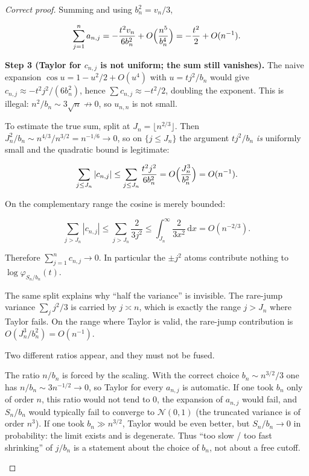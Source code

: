 \documentclass[11pt,a4paper]{article}
\begin{document}
\begin{proof}[Correct proof]
Summing and using \(b_{n}^{2}=v_{n}/3\),

\[
\sum_{j=1}^{n}a_{n,j}
=
-\frac{t^{2}v_{n}}{6b_{n}^{2}}
+
O\Bigl(\frac{n^{5}}{b_{n}^{4}}\Bigr)
=
-\frac{t^{2}}{2}
+
O(n^{-1}).
\]

\textbf{Step 3 (Taylor for \(c_{n,j}\) is not uniform; the sum still vanishes).}
The naive expansion \(\cos u=1-u^{2}/2+O(u^{4})\) with \(u=tj^{2}/b_{n}\) would give \(c_{n,j}\approx -t^{2}j^{2}/(6b_{n}^{2})\), hence \(\sum c_{n,j}\approx -t^{2}/2\), doubling the exponent. This is illegal: \(n^{2}/b_{n}\sim 3\sqrt{n}\not\to 0\), so \(u_{n,n}\) is not small.

To estimate the true sum, split at \(J_{n}=\lfloor n^{2/3}\rfloor\). Then \(J_{n}^{2}/b_{n}\sim n^{4/3}/n^{3/2}=n^{-1/6}\to 0\), so on \(\{j\le J_{n}\}\) the argument \(tj^{2}/b_{n}\) \emph{is} uniformly small and the quadratic bound is legitimate:

\[
\sum_{j\le J_{n}}|c_{n,j}|
\le
\sum_{j\le J_{n}}\frac{t^{2}j^{2}}{6b_{n}^{2}}
=
O\Bigl(\frac{J_{n}^{3}}{b_{n}^{2}}\Bigr)
=
O(n^{-1}).
\]

On the complementary range the cosine is merely bounded:

\[
\sum_{j>J_{n}}|c_{n,j}|
\le
\sum_{j>J_{n}}\frac{2}{3j^{2}}
\le
\int_{J_{n}}^{\infty}\frac{2}{3x^{2}}\,\mathrm{d}x
=
O(n^{-2/3}).
\]

Therefore \(\sum_{j=1}^{n}c_{n,j}\to 0\). In particular the \(\pm j^{2}\) atoms contribute nothing to \(\log\varphi_{S_{n}/b_{n}}(t)\).

The same split explains why ``half the variance'' is invisible. The rare-jump variance \(\sum_{j}j^{2}/3\) is carried by \(j\asymp n\), which is exactly the range \(j>J_{n}\) where Taylor fails. On the range where Taylor is valid, the rare-jump contribution is \(O(J_{n}^{3}/b_{n}^{2})=O(n^{-1})\).

\begin{remark}
\label{rem:p2-cutoff-window}
Two different ratios appear, and they must not be fused.

The ratio \(n/b_{n}\) is forced by the scaling. With the correct choice \(b_{n}\sim n^{3/2}/3\) one has \(n/b_{n}\sim 3n^{-1/2}\to 0\), so Taylor for every \(a_{n,j}\) is automatic. If one took \(b_{n}\) only of order \(n\), this ratio would not tend to \(0\), the expansion of \(a_{n,j}\) would fail, and \(S_{n}/b_{n}\) would typically fail to converge to \(\mathcal{N}(0,1)\) (the truncated variance is of order \(n^{3}\)). If one took \(b_{n}\gg n^{3/2}\), Taylor would be even better, but \(S_{n}/b_{n}\to 0\) in probability: the limit exists and is degenerate. Thus ``too slow / too fast shrinking'' of \(j/b_{n}\) is a statement about the choice of \(b_{n}\), not about a free cutoff.


\end{remark}
\end{proof}
\end{document}
